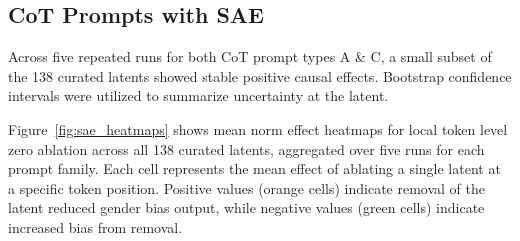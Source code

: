 \documentclass[11pt]{article}
\begin{document}



\subsection{CoT Prompts with SAE}
Across five repeated runs for both CoT prompt types A \& C, a small subset of the 138 curated latents showed stable positive causal effects. Bootstrap confidence intervals were utilized to summarize uncertainty at the latent.

Figure~\ref{fig:sae_heatmaps} shows mean norm effect heatmaps for local token level zero ablation across all 138 curated latents, aggregated over five runs for each prompt family. Each cell represents the mean effect of ablating a single latent at a specific token position. Positive values (orange cells) indicate removal of the latent reduced gender bias output, while negative values (green cells) indicate increased bias from removal. 
\end{document}
